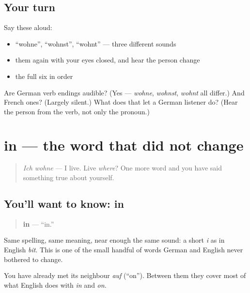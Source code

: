 \subsection*{Your turn}
Say these aloud:

\begin{itemize}
\raggedright
  \item \textquotedblleft{}wohne\textquotedblright{}, \textquotedblleft{}wohnst\textquotedblright{}, \textquotedblleft{}wohnt\textquotedblright{} — three different sounds
  \item them again with your eyes closed, and hear the person change
  \item the full six in order
\end{itemize}

\begin{tcolorbox}[breakable,colback=teal!4,colframe=teal!35!black,title={Before you move on}]
Are German verb endings audible? (Yes — \emph{wohne}, \emph{wohnst}, \emph{wohnt} all differ.) And French ones? (Largely silent.) What does that let a German listener do? (Hear the person from the verb, not only the pronoun.)
\end{tcolorbox}
\section[in]{in — the word that did not change}

\label{lesson:GE-C05-in}



\begin{quote}
\emph{Ich wohne} — I live. Live \emph{where}? One more word and you have said something true about yourself.
\end{quote}

\subsection*{You'll want to know: in}
\begin{quote}
\textbf{in} — \textquotedblleft{}in.\textquotedblright{}
\end{quote}

Same spelling, same meaning, near enough the same sound: a short \emph{i} as in English \emph{bit}. This is one of the small handful of words German and English never bothered to change.

You have already met its neighbour \emph{auf} (\textquotedblleft{}on\textquotedblright{}). Between them they cover most of what English does with \emph{in} and \emph{on}.

